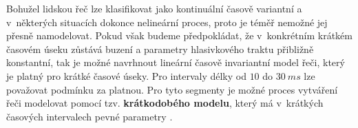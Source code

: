 Bohužel lidskou řeč lze klasifikovat jako kontinuální časově variantní a v~některých situacích dokonce nelineární proces, proto je téměř nemožné jej přesně namodelovat. Pokud však budeme předpokládat, že v~konkrétním krátkém časovém úseku zůstává buzení a parametry hlasivkového traktu přibližně konstantní, tak je možné navrhnout lineární časově invariantní model řeči, který je platný pro krátké časové úseky.
Pro intervaly délky od $10$ do $30\ ms$ lze považovat podmínku za platnou.
Pro tyto segmenty je možné proces vytváření řeči modelovat pomocí tzv. \textbf{krátkodobého modelu}, který má v~krátkých časových intervalech pevné parametry \cite{Holmes2001}.






